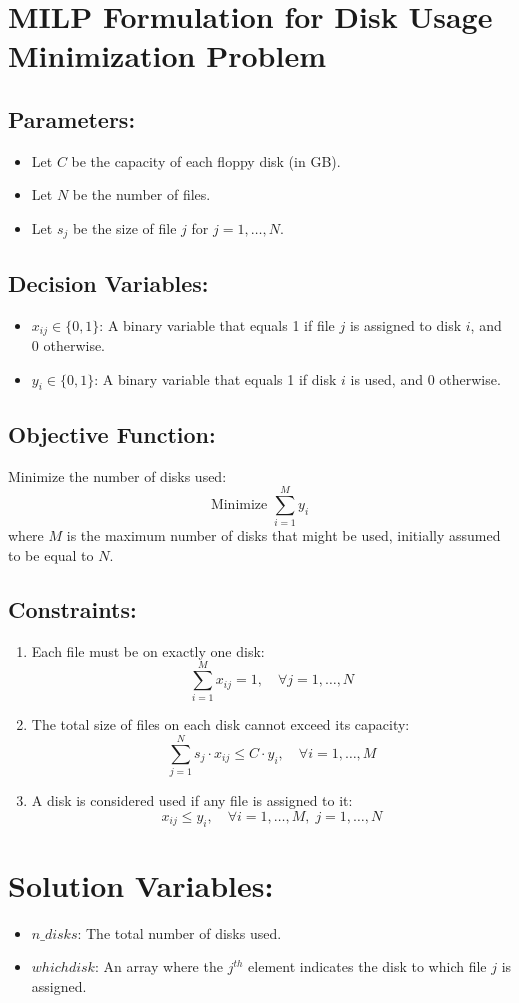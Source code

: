 \documentclass{article}
\begin{document}
\section*{MILP Formulation for Disk Usage Minimization Problem}

\subsection*{Parameters:}

\begin{itemize}
    \item Let $C$ be the capacity of each floppy disk (in GB).
    \item Let $N$ be the number of files.
    \item Let $s_j$ be the size of file $j$ for $j = 1, \ldots, N$.
\end{itemize}

\subsection*{Decision Variables:}

\begin{itemize}
    \item $x_{ij} \in \{0, 1\}$: A binary variable that equals 1 if file $j$ is assigned to disk $i$, and 0 otherwise.
    \item $y_i \in \{0, 1\}$: A binary variable that equals 1 if disk $i$ is used, and 0 otherwise.
\end{itemize}

\subsection*{Objective Function:}

Minimize the number of disks used:
\[
\text{Minimize } \sum_{i=1}^{M} y_i
\]
where $M$ is the maximum number of disks that might be used, initially assumed to be equal to $N$.

\subsection*{Constraints:}

\begin{enumerate}
    \item Each file must be on exactly one disk:
    \[
    \sum_{i=1}^{M} x_{ij} = 1, \quad \forall j = 1, \ldots, N
    \]

    \item The total size of files on each disk cannot exceed its capacity:
    \[
    \sum_{j=1}^{N} s_j \cdot x_{ij} \leq C \cdot y_i, \quad \forall i = 1, \ldots, M
    \]

    \item A disk is considered used if any file is assigned to it:
    \[
    x_{ij} \leq y_i, \quad \forall i = 1, \ldots, M, \; j = 1, \ldots, N
    \]
\end{enumerate}

\section*{Solution Variables:}

\begin{itemize}
    \item $n\_disks$: The total number of disks used.
    \item $whichdisk$: An array where the $j^{th}$ element indicates the disk to which file $j$ is assigned.
\end{itemize}
\end{document}
